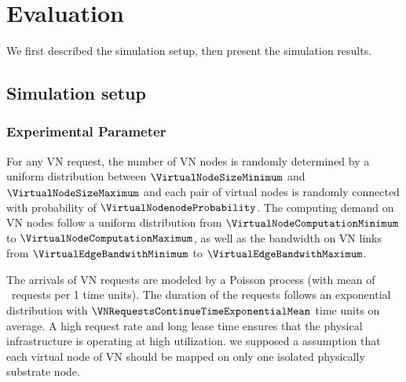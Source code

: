 
\section{Evaluation}
\label{sec:Evaluation}
We first described the simulation setup, then present the simulation results.

\subsection{Simulation setup}

\subsubsection{Experimental Parameter}
For any VN request, the number of VN nodes is randomly determined by a uniform distribution between $\VirtualNodeSizeMinimum$ and $\VirtualNodeSizeMaximum$ and each pair of virtual nodes is randomly connected with probability of $\VirtualNodenodeProbability$. The computing demand on VN nodes follow a uniform distribution from $\VirtualNodeComputationMinimum$ to $\VirtualNodeComputationMaximum$, as well as the bandwidth on VN links from $\VirtualEdgeBandwithMinimum$ to $\VirtualEdgeBandwithMaximum$.

The arrivals of VN requests are modeled by a Poisson process (with mean of \PossionMean \ requests per 1 time units).
The duration of the requests follows an exponential distribution with $\VNRequestsContinueTimeExponentialMean$ time units on average.
A high request rate and long lease time ensures that the physical infrastructure is operating at high utilization. we supposed a assumption that each virtual node of VN should be mapped on only one isolated physically substrate node.

